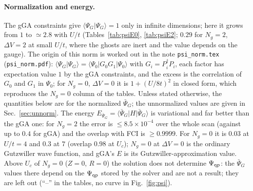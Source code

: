 \documentclass[11pt]{article}
\newcommand{\Ng}{N_{g}}
\newcommand{\dV}{\Delta V}
\begin{document}
\paragraph{Normalization and energy.} The gGA constraints give $\langle\Psi_G|\Psi_G\rangle=1$ only in infinite dimensions; here it grows from $1$ to $\simeq2.8$ with $U/t$ (Tables~\ref{tab:psiE0}, \ref{tab:psiE2}; $0.29$ for $\Ng=2$, $\dV=2$ at small $U/t$, where the ghosts are inert and the value depends on the gauge). The origin of this norm is worked out in the note \texttt{psi\_norm.tex} (\texttt{psi\_norm.pdf}): $\langle\Psi_G|\Psi_G\rangle=\langle\Psi_0|G_0G_1|\Psi_0\rangle$ with $G_i=P_i^\dagger P_i$, each factor has expectation value $1$ by the gGA constraints, and the excess is the correlation of $G_0$ and $G_1$ in $\Psi_0$; for $\Ng=0$, $\dV=0$ it is $1+(U/8t)^2$ in closed form, which reproduces the $\Ng=0$ column of the tables. Unless stated otherwise, the quantities below are for the normalized $\bar\Psi_G$; the unnormalized values are given in Sec.~\ref{sec:unnorm}.
The energy $E_{\bar\Psi_G}=\langle\bar\Psi_G|H|\bar\Psi_G\rangle$ is variational and far better than the gGA one: for $\Ng=2$ the error is $\le8.5\times10^{-4}$ over the whole scan (against up to $0.4$ for gGA) and the overlap with FCI is $\ge0.9999$. For $\Ng=0$ it is $0.03$ at $U/t=4$ and $0.3$ at $7$ (overlap $0.98$ at $U_c$); $\Ng=0$ at $\dV=0$ is the ordinary Gutzwiller wave function, and gGA's $E$ is its Gutzwiller-approximation value.
Above $U_c$ of $\Ng=0$ ($Z=0$, $R=0$) the solution does not determine $\Psi_{\rm qp}$: the $\bar\Psi_G$ values there depend on the $\Psi_{\rm qp}$ stored by the solver and are not a result; they are left out (``--'' in the tables, no curve in Fig.~\ref{fig:psi}).
\begin{table}[H]
\centering\small

\caption{$\dV=0$: norm $\langle\Psi_G|\Psi_G\rangle$, error of the gGA energy $E_{\rm gGA}-E_{\rm FCI}$, of the normalized $E_{\bar\Psi_G}-E_{\rm FCI}$ and of the unnormalized $\langle H\rangle_{\Psi_G}-E_{\rm FCI}$, overlap deficit of $\bar\Psi_G$ with the FCI ground state and unnormalized overlap $|\langle\Psi_G|{\rm FCI}\rangle|=\sqrt{\langle\Psi_G|\Psi_G\rangle}\,|\langle\bar\Psi_G|{\rm FCI}\rangle|$. --: not shown, above $U_c$ of $\Ng=0$ the state $\bar\Psi_G$ is not determined ($\Psi_{\rm qp}$ is not fixed by the solution).}
\label{tab:psiE0}
\end{table}
\begin{table}[H]
\centering\small

\caption{As Table~\ref{tab:psiE0} for $\dV=2$ ($\Ng=2$ from the non-impurity scan).}
\label{tab:psiE2}
\end{table}
\end{document}
